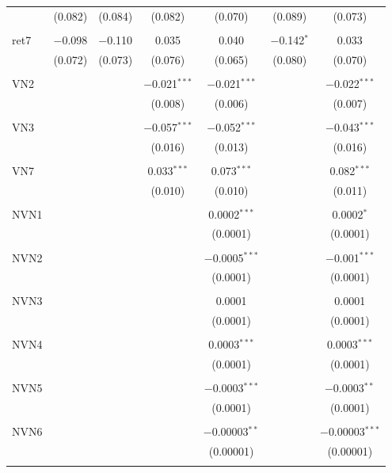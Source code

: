 \begin{table}[!htbp]
\begin{tabular}{@{\extracolsep{5pt}}lcccccc}
  & (0.082) & (0.084) & (0.082) & (0.070) & (0.089) & (0.073) \\ 
  & & & & & & \\ 
 ret7 & $-$0.098 & $-$0.110 & 0.035 & 0.040 & $-$0.142$^{*}$ & 0.033 \\ 
  & (0.072) & (0.073) & (0.076) & (0.065) & (0.080) & (0.070) \\ 
  & & & & & & \\ 
 VN2 &  &  & $-$0.021$^{***}$ & $-$0.021$^{***}$ &  & $-$0.022$^{***}$ \\ 
  &  &  & (0.008) & (0.006) &  & (0.007) \\ 
  & & & & & & \\ 
 VN3 &  &  & $-$0.057$^{***}$ & $-$0.052$^{***}$ &  & $-$0.043$^{***}$ \\ 
  &  &  & (0.016) & (0.013) &  & (0.016) \\ 
  & & & & & & \\ 
 VN7 &  &  & 0.033$^{***}$ & 0.073$^{***}$ &  & 0.082$^{***}$ \\ 
  &  &  & (0.010) & (0.010) &  & (0.011) \\ 
  & & & & & & \\ 
 NVN1 &  &  &  & 0.0002$^{***}$ &  & 0.0002$^{*}$ \\ 
  &  &  &  & (0.0001) &  & (0.0001) \\ 
  & & & & & & \\ 
 NVN2 &  &  &  & $-$0.0005$^{***}$ &  & $-$0.001$^{***}$ \\ 
  &  &  &  & (0.0001) &  & (0.0001) \\ 
  & & & & & & \\ 
 NVN3 &  &  &  & 0.0001 &  & 0.0001 \\ 
  &  &  &  & (0.0001) &  & (0.0001) \\ 
  & & & & & & \\ 
 NVN4 &  &  &  & 0.0003$^{***}$ &  & 0.0003$^{***}$ \\ 
  &  &  &  & (0.0001) &  & (0.0001) \\ 
  & & & & & & \\ 
 NVN5 &  &  &  & $-$0.0003$^{***}$ &  & $-$0.0003$^{**}$ \\ 
  &  &  &  & (0.0001) &  & (0.0001) \\ 
  & & & & & & \\ 
 NVN6 &  &  &  & $-$0.00003$^{**}$ &  & $-$0.00003$^{***}$ \\ 
  &  &  &  & (0.00001) &  & (0.00001) \\ 
  & & & & & & \\ 

\end{tabular}
\end{table}
